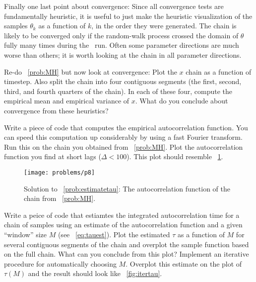 \documentclass[12pt,twoside,pdftex]{article}
\newcommand{\MCMC}{\acronym{MCMC}}
\newcommand{\pars}{\theta}
\begin{document}
Finally one last point about convergence:
Since all convergence tests are fundamentally heuristic, it is useful
to just make the heuristic visualization of the samples $\pars_k$ as a
function of $k$, in the order they were generated.
The chain is likely to be converged only if the random-walk process
crossed the domain of $\pars$ fully many times during the \MCMC\ run.
Often some parameter directions are much worse than others; it is
worth looking at the chain in all parameter directions.

\begin{problem}\label{prob:convergence}
Re-do \problemname~\ref{prob:MH} but now look at convergence:
Plot the $x$ chain as a function of timestep.  Also split the chain
into four contiguous segments (the first, second, third, and fourth
quarters of the chain).  In each of these four, compute the empirical
mean and empirical variance of $x$.  What do you conclude about
convergence from these heuristics?
\end{problem}

\begin{problem}\label{prob:estimatetau}
Write a piece of code that computes the empirical autocorrelation
function.
You can speed this computation up considerably by using a fast Fourier
transform.
Run this on the chain you obtained from \problemname~\ref{prob:MH}.
Plot the autocorrelation function you find at short lags ($\Delta < 100$).
This plot should resemble \figurename~\ref{fig:estimatetau}.
\end{problem}

\begin{figure}[!htbp]
\begin{center}
\texttt{[image: problems/p8]}
\end{center}
\caption{Solution to \problemname~\ref{prob:estimatetau}:
The autocorrelation function of the chain from \problemname~\ref{prob:MH}.}
\label{fig:estimatetau}
\end{figure}

\begin{problem}\label{prob:itertau}
Write a peice of code that estiamtes the integrated autocorrelation time for a
chain of samples using an estimate of the autocorrelation function and a given
``window'' size $M$ (see \equationname~\ref{eq:tauest}).
Plot the estimated $\tau$ as a function of $M$ for several contiguous segments
of the chain and overplot the sample function based on the full chain.
What can you conclude from this plot?
Implement an iterative procedure for automatically choosing $M$.
Overplot this estimate on the plot of $\tau(M)$ and the result should look
like \figurename~\ref{fig:itertau}.
\end{problem}
\end{document}
